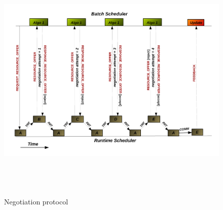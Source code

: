 \begin{figure}[!htbp]
\hspace*{-0.5in}
\includegraphics[width=1.2\textwidth, height=120mm]{./figures/negotiation.pdf}
\caption{Negotiation protocol}
\label{fig:1}
\end{figure}
